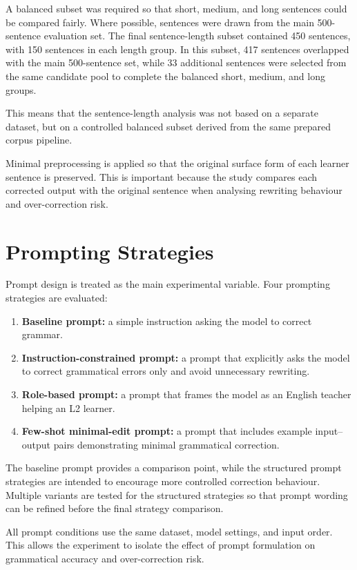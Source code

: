 A balanced subset was required so that short, medium, and long sentences could be compared fairly. Where possible, sentences were drawn from the main 500-sentence evaluation set. The final sentence-length subset contained 450 sentences, with 150 sentences in each length group. In this subset, 417 sentences overlapped with the main 500-sentence set, while 33 additional sentences were selected from the same candidate pool to complete the balanced short, medium, and long groups.

This means that the sentence-length analysis was not based on a separate dataset, but on a controlled balanced subset derived from the same prepared corpus pipeline.

Minimal preprocessing is applied so that the original surface form of each learner sentence is preserved. This is important because the study compares each corrected output with the original sentence when analysing rewriting behaviour and over-correction risk.

\section{Prompting Strategies}

Prompt design is treated as the main experimental variable. Four prompting strategies are evaluated:

\begin{enumerate}
    \item \textbf{Baseline prompt:} a simple instruction asking the model to correct grammar.
    \item \textbf{Instruction-constrained prompt:} a prompt that explicitly asks the model to correct grammatical errors only and avoid unnecessary rewriting.
    \item \textbf{Role-based prompt:} a prompt that frames the model as an English teacher helping an L2 learner.
    \item \textbf{Few-shot minimal-edit prompt:} a prompt that includes example input--output pairs demonstrating minimal grammatical correction.
\end{enumerate}

The baseline prompt provides a comparison point, while the structured prompt strategies are intended to encourage more controlled correction behaviour. Multiple variants are tested for the structured strategies so that prompt wording can be refined before the final strategy comparison.

All prompt conditions use the same dataset, model settings, and input order. This allows the experiment to isolate the effect of prompt formulation on grammatical accuracy and over-correction risk.

